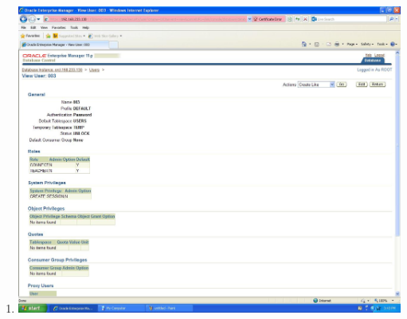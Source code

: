 \documentclass{article}
\begin{document}
\begin{enumerate}
	\item
		\includegraphics[scale=0.4]{figs/15.JPG}
\end{enumerate}
\end{document}
